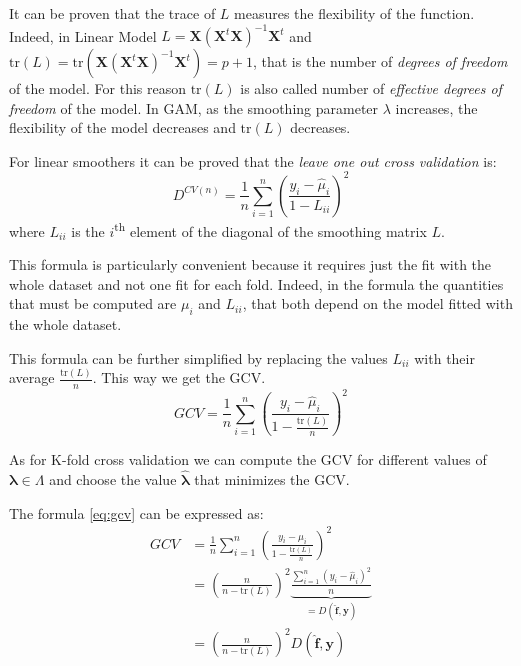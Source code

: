 \documentclass[a4paper, nobind]{templates/ociamthesis}
\theoremstyle{definition}
\theoremstyle{definition}
\theoremstyle{definition}
\theoremstyle{remark}
\begin{document}
It can be proven that the trace of \(L\) measures the flexibility of the function. Indeed, in Linear Model \(L = \boldsymbol{X} \left( \boldsymbol{X}^t\boldsymbol{X} \right)^{-1}\boldsymbol{X}^t\) and \(\text{tr}(L) = \text{tr}\left( \boldsymbol{X} \left( \boldsymbol{X}^t\boldsymbol{X} \right)^{-1}\boldsymbol{X}^t \right) = p + 1\), that is the number of \emph{degrees of freedom} of the model. For this reason \(\text{tr}(L)\) is also called number of \emph{effective degrees of freedom} of the model. In GAM, as the smoothing parameter \(\lambda\) increases, the flexibility of the model decreases and \(\text{tr}(L)\) decreases.

For linear smoothers it can be proved that the \emph{leave one out cross validation} is:
\[
D^{CV(n)} = \frac{1}{n} \sum_{i=1}^{n}{\left( \frac{y_i - \hat{\mu}_i}{1 - L_{ii}} \right)^2}
\]
where \(L_{ii}\) is the \(i\)\textsuperscript{th} element of the diagonal of the smoothing matrix \(L\).

This formula is particularly convenient because it requires just the fit with the whole dataset and not one fit for each fold. Indeed, in the formula the quantities that must be computed are \(\mu_i\) and \(L_{ii}\), that both depend on the model fitted with the whole dataset.

This formula can be further simplified by replacing the values \(L_{ii}\) with their average \(\frac{\text{tr}(L)}{n}\). This way we get the GCV.
\begin{equation}
\label{eq:gcv}
GCV = \frac{1}{n} \sum_{i=1}^{n}{\left( \frac{y_i - \hat{\mu}_i}{1 - \frac{\text{tr}(L)}{n}} \right)^2}
\end{equation}

As for K-fold cross validation we can compute the GCV for different values of \(\boldsymbol{\lambda} \in \Lambda\) and choose the value \(\boldsymbol{\hat{\lambda}}\) that minimizes the GCV.

The formula \eqref{eq:gcv} can be expressed as:
\begin{align}
\nonumber
GCV & = \frac{1}{n} \sum_{i=1}^{n}{\left( \frac{y_i - \hat{\mu}_i}{1 - \frac{\text{tr}(L)}{n}} \right)^2} \\
\nonumber
& = \left( \frac{n}{n - \text{tr}(L)} \right)^2 \underbrace{\frac{\sum_{i=1}^{n}{\left( y_i - \hat{\mu}_i \right)^2}}{n}}_{=D(\boldsymbol{\hat{f}},\boldsymbol{y})} \\
\label{eq:gcv-gam}
& = \left( \frac{n}{n - \text{tr}(L)} \right)^2 D(\boldsymbol{\hat{f}},\boldsymbol{y})
\end{align}
\end{document}
